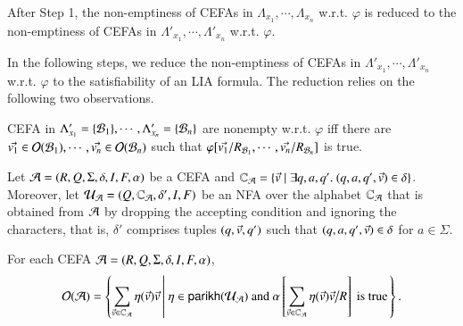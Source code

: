 After Step 1, the non-emptiness of CEFAs in $\Lambda_{x_1}, \cdots, \Lambda_{x_n}$ w.r.t. $\varphi$ is reduced to the non-emptiness of CEFAs in $\Lambda'_{x_1}, \cdots, \Lambda'_{x_n}$ w.r.t. $\varphi$. 

In the following steps, we reduce the non-emptiness of CEFAs in $\Lambda'_{x_1}, \cdots, \Lambda'_{x_n}$ w.r.t. $\varphi$ to the satisfiability of an LIA formula. The reduction relies on the following two observations. 

\begin{observation}\label{obs-cefa-output}
CEFA in $\Lambda'_{x_1} = \{\mathcal{B}_1\}, \cdots, \Lambda'_{x_n} = \{\mathcal{B}_n\}$ are nonempty w.r.t. $\varphi$ iff there are $\vec{v_{1}} \in \mathcal{O}(\mathcal{B}_1), \cdots, \vec{v_{n}} \in \mathcal{O}(\mathcal{B}_n)$ such that $\varphi[\vec{v_{1}}/R_{\mathcal{B}_{1}}, \cdots, \vec{v_{n}}/R_{\mathcal{B}_{n}}]$ is true.
\end{observation}

Let $\mathcal{A} = (R, Q, \Sigma, \delta, I, F, \alpha)$ be a CEFA and $\mathbb{C}_{\mathcal{A}} = \{\vec{v} \mid \exists q, a, q'.\ (q, a, q', \vec{v}) \in \delta\}$. 
Moreover, let $\mathcal{U}_{\mathcal{A}} = (Q, \mathbb{C}_{\mathcal{A}}, \delta', I, F)$ be an NFA over the alphabet $\mathbb{C}_{\mathcal{A}}$ that is obtained from $\mathcal{A}$ by dropping the accepting condition and ignoring the characters, that is, $\delta'$ comprises tuples $(q, \vec{v}, q')$ such that $(q, a, q', \vec{v}) \in \delta$ for $a \in \Sigma$.
%

\begin{observation}\label{obs-cefa-nfa}
For each CEFA $\mathcal{A} = (R, Q, \Sigma, \delta, I, F, \alpha)$, 
%
$$\mathcal{O}(\mathcal{A}) = \left\{\sum \limits_{\vec{v} \in \mathbb{C}_{\mathcal{A}}} \eta(\vec{v}) \vec{v} \left \vert\ \eta \in \mathsf{parikh}(\mathcal{U}_{\mathcal{A}}) \mbox{ and }  \alpha\left[  \sum \limits_{\vec{v} \in \mathbb{C}_{\mathcal{A}}} \eta(\vec{v}) \vec{v} \big{/}  R \right] \mbox{ is true}\right.\right\}.$$
%
\end{observation}


